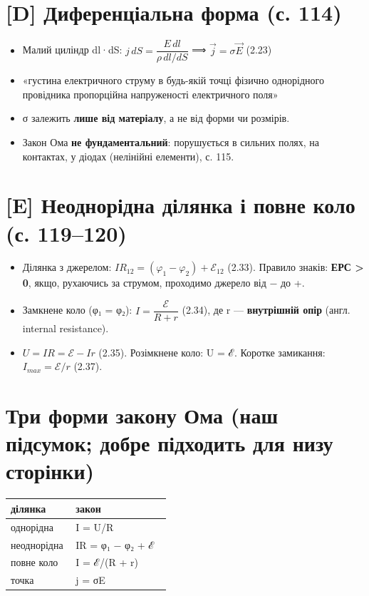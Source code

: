 \documentclass[11pt,a4paper,oneside]{book}
\begin{document}
\section*{[D] Диференціальна форма (с. 114)}
\begin{itemize}
\item Малий циліндр dl·dS: $j\,dS = \dfrac{E\,dl}{\rho\,dl/dS}$ ⟹ $\vec j = \sigma\vec E$ (2.23)
\item «густина електричного струму в будь-якій точці фізично однорідного провідника пропорційна напруженості електричного поля»
\item σ залежить \textbf{лише від матеріалу}, а не від форми чи розмірів.
\item Закон Ома \textbf{не фундаментальний}: порушується в сильних полях, на контактах, у діодах (нелінійні елементи), с. 115.
\end{itemize}

\section*{[E] Неоднорідна ділянка і повне коло (с. 119–120)}
\begin{itemize}
\item Ділянка з джерелом: $IR_{12} = (\varphi_1-\varphi_2) + \mathcal E_{12}$ (2.33). Правило знаків: \textbf{ЕРС > 0}, якщо, рухаючись за струмом, проходимо джерело від − до +.
\item Замкнене коло (φ₁ = φ₂): $I = \dfrac{\mathcal E}{R+r}$ (2.34), де r — \textbf{внутрішній опір} (англ. internal resistance).
\item $U = IR = \mathcal E - Ir$ (2.35). Розімкнене коло: U = ℰ. Коротке замикання: $I_{max} = \mathcal E/r$ (2.37).
\end{itemize}

\section*{Три форми закону Ома (наш підсумок; добре підходить для низу сторінки)}
{\small
\begin{longtable}{>{\raggedright\arraybackslash}p{0.394\linewidth}>{\raggedright\arraybackslash}p{0.574\linewidth}}
\toprule
\textbf{ділянка} & \textbf{закон} \\
\midrule
\endhead
однорідна & I = U/R \\
неоднорідна & IR = φ₁ − φ₂ + ℰ \\
повне коло & I = ℰ/(R + r) \\
точка & j = σE \\
\bottomrule
\end{longtable}
}
\end{document}
